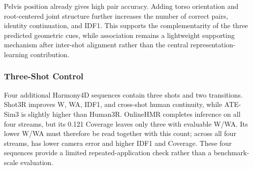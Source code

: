 Pelvis position already gives high pair accuracy. Adding torso orientation and
root-centered joint structure further increases the number of correct pairs,
identity continuation, and IDF1. This supports the complementarity of the
three predicted geometric cues, while association remains a lightweight
supporting mechanism after inter-shot alignment rather than the central
representation-learning contribution.

\subsubsection{Three-Shot Control}
\label{app:multicut}

Four additional Harmony4D sequences contain three shots and two transitions.
Shot3R improves W, WA, IDF1, and cross-shot human continuity, while ATE-Sim3
is slightly higher than Human3R. OnlineHMR completes inference on all four
streams, but its 0.121 Coverage leaves only three with evaluable W/WA. Its
lower W/WA must therefore be read together with this count; across all four
streams, \method{} has lower camera error and higher IDF1 and Coverage.
These four sequences provide a limited repeated-application check rather than
a benchmark-scale evaluation.

\begin{table}[t]
  \centering
  \caption{Harmony4D three-shot results. W/WA are in mm; camera and root
  errors are in m. Parentheses give the number of evaluable sequences;
  Coverage is computed over all four streams.}
  \label{tab:supp-harmony-multicut}
  \small
  
\end{table}
